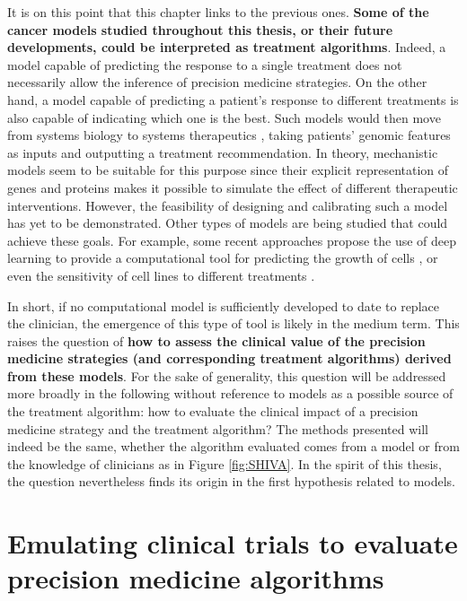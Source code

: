 \documentclass[a4paper,12pt,twoside,onecolumn,openright,final,oldfontcommands]{memoir}
\begin{document}
It is on this point that this chapter links to the previous ones.
\textbf{Some of the cancer models studied throughout this thesis, or
their future developments, could be interpreted as treatment
algorithms}. Indeed, a model capable of predicting the response to a
single treatment does not necessarily allow the inference of precision
medicine strategies. On the other hand, a model capable of predicting a
patient's response to different treatments is also capable of indicating
which one is the best. Such models would then move from systems biology
to systems therapeutics \citep{hansen2013computation}, taking patients'
genomic features as inputs and outputting a treatment recommendation. In
theory, mechanistic models seem to be suitable for this purpose since
their explicit representation of genes and proteins makes it possible to
simulate the effect of different therapeutic interventions. However, the
feasibility of designing and calibrating such a model has yet to be
demonstrated. Other types of models are being studied that could achieve
these goals. For example, some recent approaches propose the use of deep
learning to provide a computational tool for predicting the growth of
cells \citep{ma2018using}, or even the sensitivity of cell lines to
different treatments \citep{manica2019toward}.

In short, if no computational model is sufficiently developed to date to
replace the clinician, the emergence of this type of tool is likely in
the medium term. This raises the question of \textbf{how to assess the
clinical value of the precision medicine strategies (and corresponding
treatment algorithms) derived from these models}. For the sake of
generality, this question will be addressed more broadly in the
following without reference to models as a possible source of the
treatment algorithm: how to evaluate the clinical impact of a precision
medicine strategy and the treatment algorithm? The methods presented
will indeed be the same, whether the algorithm evaluated comes from a
model or from the knowledge of clinicians as in Figure \ref{fig:SHIVA}.
In the spirit of this thesis, the question nevertheless finds its origin
in the first hypothesis related to models.

\section{Emulating clinical trials to evaluate precision medicine
algorithms}\label{emulating-clinical-trials-to-evaluate-precision-medicine-algorithms}
\end{document}
